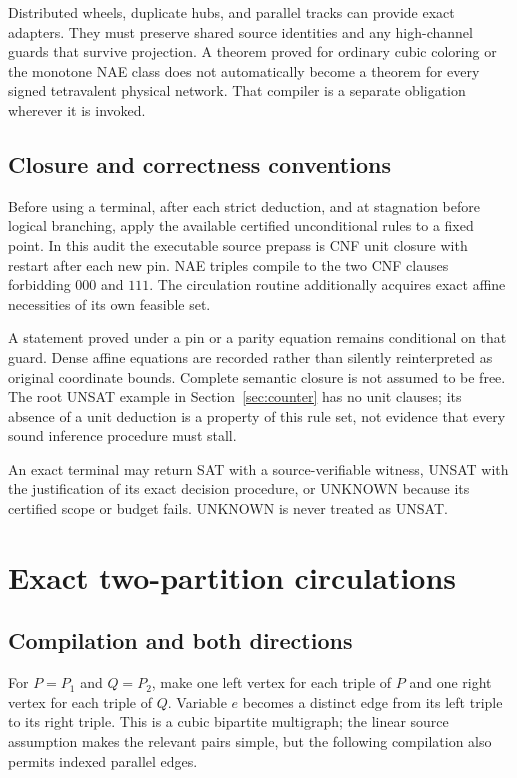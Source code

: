 \documentclass[11pt,letterpaper]{article}
\theoremstyle{definition}
\begin{document}
Distributed wheels, duplicate hubs, and parallel tracks can provide exact adapters. They must preserve shared source identities and any high-channel guards that survive projection. A theorem proved for ordinary cubic coloring or the monotone NAE class does not automatically become a theorem for every signed tetravalent physical network. That compiler is a separate obligation wherever it is invoked.

\subsection{Closure and correctness conventions}

Before using a terminal, after each strict deduction, and at stagnation before logical branching, apply the available certified unconditional rules to a fixed point. In this audit the executable source prepass is CNF unit closure with restart after each new pin. NAE triples compile to the two CNF clauses forbidding $000$ and $111$. The circulation routine additionally acquires exact affine necessities of its own feasible set.

A statement proved under a pin or a parity equation remains conditional on that guard. Dense affine equations are recorded rather than silently reinterpreted as original coordinate bounds. Complete semantic closure is not assumed to be free. The root UNSAT example in Section~\ref{sec:counter} has no unit clauses; its absence of a unit deduction is a property of this rule set, not evidence that every sound inference procedure must stall.

An exact terminal may return SAT with a source-verifiable witness, UNSAT with the justification of its exact decision procedure, or UNKNOWN because its certified scope or budget fails. UNKNOWN is never treated as UNSAT.

\section{Exact two-partition circulations}

\subsection{Compilation and both directions}

For $P=P_1$ and $Q=P_2$, make one left vertex for each triple of $P$ and one right vertex for each triple of $Q$. Variable $e$ becomes a distinct edge from its left triple to its right triple. This is a cubic bipartite multigraph; the linear source assumption makes the relevant pairs simple, but the following compilation also permits indexed parallel edges.
\end{document}
